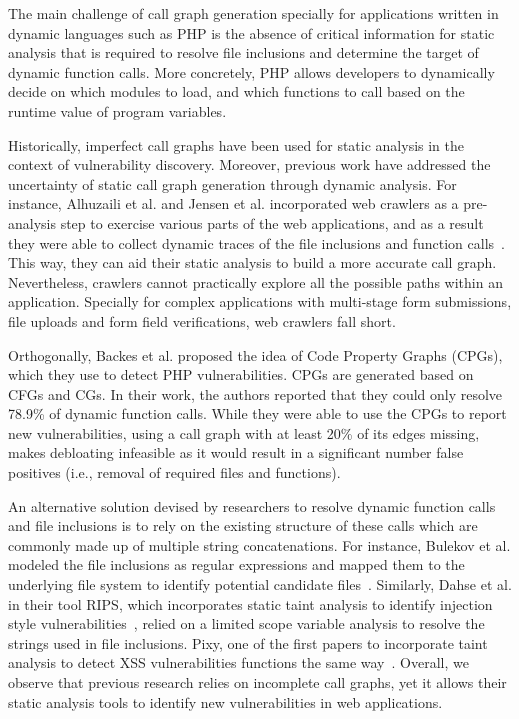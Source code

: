 The main challenge of call graph generation specially for applications written in dynamic languages such as PHP is the absence of critical information for static analysis that is required to resolve file inclusions and determine the target of dynamic function calls. 
More concretely, PHP allows developers to dynamically decide on which modules to load, and which functions to call based on the runtime value of program variables. 

Historically, imperfect call graphs have been used for static analysis in the context of vulnerability discovery. 
Moreover, previous work have addressed the uncertainty of static call graph generation through dynamic analysis. 
For instance, Alhuzaili et al. and Jensen et al. incorporated web crawlers as a pre-analysis step to exercise various parts of the web applications, and as a result they were able to collect dynamic traces of the file inclusions and function calls~\cite{alhuzali2018navex, jensen2012thaps}. 
This way, they can aid their static analysis to build a more accurate call graph. 
Nevertheless, crawlers cannot practically explore all the possible paths within an application. 
Specially for complex applications with multi-stage form submissions, file uploads and form field verifications, web crawlers fall short. 

Orthogonally, Backes et al. proposed the idea of Code Property Graphs (CPGs), which they use to detect PHP vulnerabilities. 
CPGs are generated based on CFGs and CGs. 
In their work, the authors reported that they could only resolve 78.9\% of dynamic function calls. 
While they were able to use the CPGs to report new vulnerabilities, using a call graph with at least 20\% of its edges missing, makes debloating infeasible as it would result in a significant number false positives (i.e., removal of required files and functions). 

An alternative solution devised by researchers to resolve dynamic function calls and file inclusions is to rely on the existing structure of these calls which are commonly made up of multiple string concatenations. 
For instance, Bulekov et al. modeled the file inclusions as regular expressions and mapped them to the underlying file system to identify potential candidate files~\cite{saphire}. 
Similarly, Dahse et al. in their tool RIPS, which incorporates static taint analysis to identify injection style vulnerabilities~\cite{dahse2010rips}, relied on a limited scope variable analysis to resolve the strings used in file inclusions. 
Pixy, one of the first papers to incorporate taint analysis to detect XSS vulnerabilities functions the same way~\cite{jovanovic2006pixy}. 
Overall, we observe that previous research relies on incomplete call graphs, yet it allows their static analysis tools to identify new vulnerabilities in web applications.

